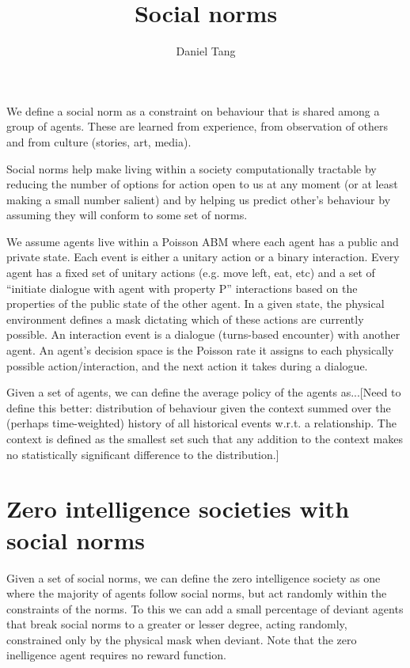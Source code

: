\documentclass[a4paper]{article}
\title{Social norms}
\author{Daniel Tang}
\begin{document}
\maketitle

We define a social norm as a constraint on behaviour that is shared among a group of agents. These are learned from experience, from observation of others and from culture (stories, art, media).

Social norms help make living within a society computationally tractable by reducing the number of options for action open to us at any moment (or at least making a small number salient) and by helping us predict other's behaviour by assuming they will conform to some set of norms.

We assume agents live within a Poisson ABM where each agent has a public and private state. Each event is either a unitary action or a binary interaction. Every agent has a fixed set of unitary actions (e.g. move left, eat, etc) and a set of ``initiate dialogue with agent with property P'' interactions based on the properties of the public state of the other agent. In a given state, the physical environment defines a mask dictating which of these actions are currently possible. An interaction event is a dialogue (turns-based encounter) with another agent. An agent's decision space is the Poisson rate it assigns to each physically possible action/interaction, and the next action it takes during a dialogue.

Given a set of agents, we can define the average policy of the agents as...[Need to define this better:  distribution of behaviour given the context summed over the (perhaps time-weighted) history of all historical events w.r.t. a relationship. The context is defined as the smallest set such that any addition to the context makes no statistically significant difference to the distribution.]

\section{Zero intelligence societies with social norms}

Given a set of social norms, we can define the zero intelligence society as one where the majority of agents follow social norms, but act randomly within the constraints of the norms. To this we can add a small percentage of deviant agents that break social norms to a greater or lesser degree, acting randomly, constrained only by the physical mask when deviant. Note that the zero inelligence agent requires no reward function.
\end{document}
